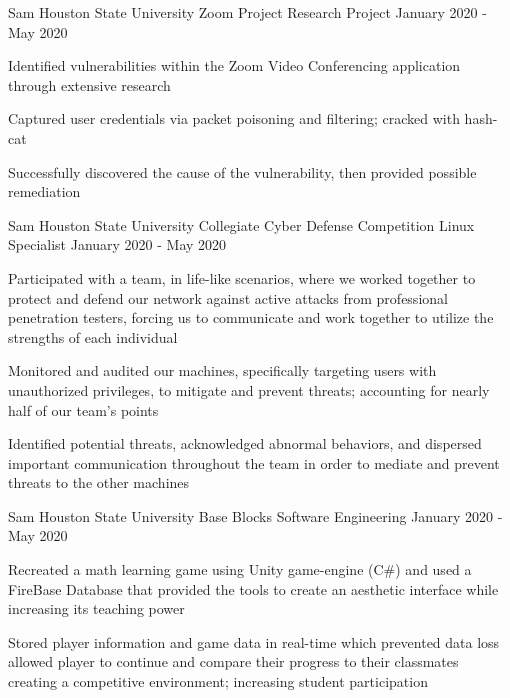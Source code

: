 \begin{cventries}
	\cventry
	  {Sam Houston State University} %
      {Zoom Project} %
	  {Research Project} %
	  {January 2020 - May 2020} %
	  {
	    \begin{cvitems} %
			\item {Identified vulnerabilities within the Zoom Video Conferencing application through extensive research}
			\item {Captured user credentials via packet poisoning and filtering; cracked with hash-cat}
			\item {Successfully discovered the cause of the vulnerability, then provided possible remediation }
		\end{cvitems}
	  }

	\cventry
	  {Sam Houston State University} %
	  {Collegiate Cyber Defense Competition} %
	  {Linux Specialist} %
      {January 2020 - May 2020} %
	  {
	    \begin{cvitems} %
			\item {Participated with a team, in life-like scenarios, where we worked together to protect and defend our network against active attacks from professional penetration testers, forcing us to communicate and work together to utilize the strengths of each individual}
			\item {Monitored and audited our machines, specifically targeting users with unauthorized privileges, to mitigate and prevent threats; accounting for nearly half of our team's points}
			\item {Identified potential threats, acknowledged abnormal behaviors, and dispersed important communication throughout the team in order to mediate and prevent threats to the other machines}
		\end{cvitems}
	  }
    \cventry
      {Sam Houston State University} %
	  {Base Blocks} %
      {Software Engineering} %
      {January 2020 - May 2020} %
      {
        \begin{cvitems} %
		    \item {Recreated a math learning game using Unity game-engine (C\#) and used a FireBase Database that provided the tools to create an aesthetic interface while increasing its teaching power}
	        \item {Stored player information and game data in real-time which prevented data loss allowed player to continue and compare their progress to their classmates creating a competitive environment; increasing student participation}
       \end{cvitems}
      }


\end{cventries}
